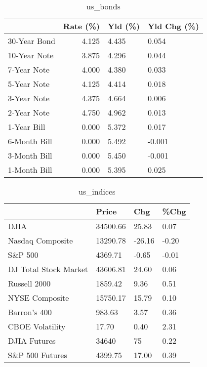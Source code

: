 \documentclass{article}%
\begin{document}
%


\begin{table}[htbp]%
\caption{us\_bonds}%
\centering%
\begin{adjustbox}{width=1\textwidth}%
\begin{tabular}{lrll}
\toprule
             &  Rate (\%) & Yld (\%) & Yld Chg (\%) \\
\midrule
30-Year Bond &     4.125 &   4.435 &       0.054 \\
10-Year Note &     3.875 &   4.296 &       0.044 \\
 7-Year Note &     4.000 &   4.380 &       0.033 \\
 5-Year Note &     4.125 &   4.414 &       0.018 \\
 3-Year Note &     4.375 &   4.664 &       0.006 \\
 2-Year Note &     4.750 &   4.962 &       0.013 \\
 1-Year Bill &     0.000 &   5.372 &       0.017 \\
6-Month Bill &     0.000 &   5.492 &      -0.001 \\
3-Month Bill &     0.000 &   5.450 &      -0.001 \\
1-Month Bill &     0.000 &   5.395 &       0.025 \\
\bottomrule
\end{tabular}
%
\end{adjustbox}%
\end{table}

%


\begin{table}[htbp]%
\caption{us\_indices}%
\centering%
\begin{adjustbox}{width=1\textwidth}%
\begin{tabular}{llll}
\toprule
                      &    Price &    Chg &  \%Chg \\
\midrule
                 DJIA & 34500.66 &  25.83 &  0.07 \\
     Nasdaq Composite & 13290.78 & -26.16 & -0.20 \\
              S\&P 500 &  4369.71 &  -0.65 & -0.01 \\
DJ Total Stock Market & 43606.81 &  24.60 &  0.06 \\
         Russell 2000 &  1859.42 &   9.36 &  0.51 \\
       NYSE Composite & 15750.17 &  15.79 &  0.10 \\
         Barron's 400 &   983.63 &   3.57 &  0.36 \\
      CBOE Volatility &    17.70 &   0.40 &  2.31 \\
         DJIA Futures &    34640 &     75 &  0.22 \\
      S\&P 500 Futures &  4399.75 &  17.00 &  0.39 \\
\bottomrule
\end{tabular}
%
\end{adjustbox}%
\end{table}
\end{document}
